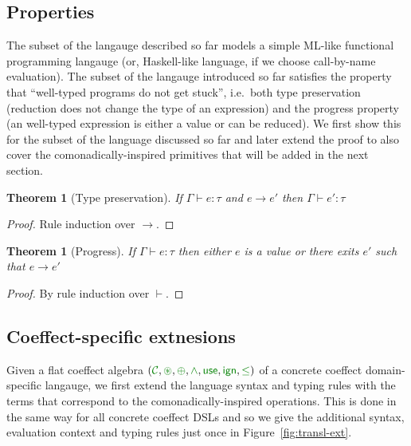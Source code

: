 \documentclass[
		twoside,openright,titlepage,numbers=noenddot,headinclude,%
                footinclude=true,cleardoublepage=empty,
                BCOR=10mm,paper=a4,fontsize=10pt, %
                ngerman,american, %
                ]{scrreprt}
\newcounter{mythmcounter}
\newtheorem{theorem}[mythmcounter]{Theorem}
\newcommand{\czero}{ \textcolor{cclr}{ \mathsf{ign} } }
\newcommand{\cunit}{ \textcolor{cclr}{ \mathsf{use} } }
\newcommand{\cseq}{ \textcolor{cclr}{ \circledast }}
\newcommand{\cpar}{ \textcolor{cclr}{\oplus} }
\newcommand{\czip}{ \textcolor{cclr}{\wedge} } %
\newcommand{\cleq}{ \textcolor{cclr}{\leq} }
\newcommand{\C}{ {\textcolor{cclr}{\mathcal{C}}} }
\begin{document}

\subsection{Properties}

The subset of the langauge described so far models a simple ML-like functional programming 
langauge (or, Haskell-like language, if we choose call-by-name evaluation). The subset of the
langauge introduced so far satisfies the property that ``well-typed programs do not get stuck'',
i.e.~both type preservation (reduction does not change the type of an expression) and the progress 
property (an well-typed expression is either a value or can be reduced).
We first show this for the subset of the language discussed so far and later extend the proof to 
also cover the comonadically-inspired primitives that will be added in the next section.

\begin{theorem}[Type preservation]
  If $\Gamma \vdash e : \tau$ and $e \rightarrow e'$ then $\Gamma \vdash e' : \tau$
\end{theorem}
\begin{proof}
  Rule induction over $\rightarrow$.
\end{proof}

\begin{theorem}[Progress]
  If $\Gamma \vdash e : \tau$ then either $e$ is a value or there exits $e'$ such that $e \rightarrow e'$
\end{theorem}
\begin{proof}
  By rule induction over $\vdash$.
\end{proof}


\subsection{Coeffect-specific extnesions}

Given a flat coeffect algebra $(\C, \cseq, \cpar, \czip, \cunit, \czero, \cleq)$ of a concrete 
coeffect domain-specific langauge, we first extend the language syntax and typing rules with 
the terms that correspond to the comonadically-inspired operations. This is done in the same way
for all concrete coeffect DSLs and so we give the additional syntax, evaluation context and 
typing rules just once in Figure~\ref{fig:transl-ext}.
\end{document}
